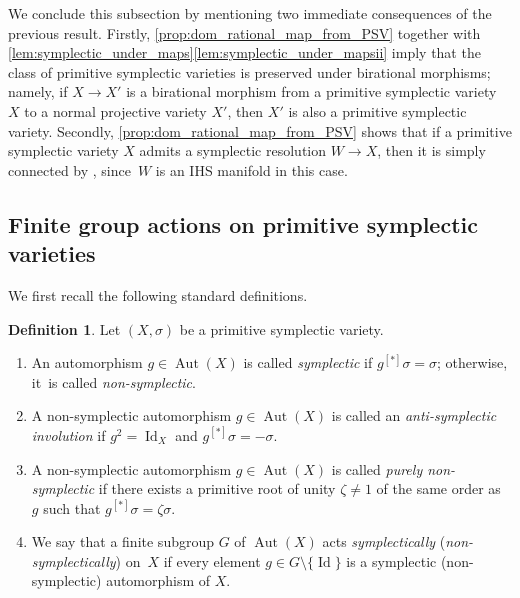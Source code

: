 \documentclass[JEP,XML,SOM,Unicode,published]{cedram}
\theoremstyle{plain}
\theoremstyle{definition}
\newtheorem{dfn}[thm]{Definition}
\DeclareMathOperator{\Id}{Id}
\DeclareMathOperator{\Aut}{Aut}
\begin{document}
We conclude this subsection by mentioning two immediate consequences of the previous result. Firstly, \autoref{prop:dom_rational_map_from_PSV} together with \autoref{lem:symplectic_under_maps}\eqref{lem:symplectic_under_mapsii} imply that the class of primitive symplectic varieties is preserved under birational morphisms; namely, if $X \to X'$ is a birational morphism from a primitive symplectic variety~$X$ to a normal projective variety $X'$, then $X'$ is also a primitive symplectic variety. Secondly, \autoref{prop:dom_rational_map_from_PSV} shows that if a primitive symplectic variety $X$ admits a symplectic resolution $W \to X$, then it is simply connected by \cite[Th.\,1.1]{Tak03}, since~$W$ is an IHS manifold in this case.

\subsection{Finite group actions on primitive symplectic varieties}
\label{subsection:finite_group_actions}

We first recall the following standard definitions.

\begin{dfn}
Let $(X,\sigma)$ be a primitive symplectic variety.
\begin{enumerate}
\item
An automorphism $g \in \Aut(X)$ is called \emph{symplectic} if $g^{[*]} \sigma = \sigma$; otherwise, it~is called \emph{non-symplectic}.

\item
A non-symplectic automorphism $g \in \Aut(X)$ is called an \emph{anti-symplectic involution} if $g^2 = \Id_X$ and $g^{[*]} \sigma = - \sigma$.

\item
A non-symplectic automorphism $g \in \Aut(X)$ is called \emph{purely non-symplectic} if there exists a primitive root of unity $\zeta \neq 1$ of the same order as $g$ such that $g^{[*]} \sigma = \zeta \sigma$.

\item
We say that a finite subgroup $G$ of $\Aut(X)$ acts \emph{symplectically} (\resp \emph{non-symplec\-tically}) on~$X$ if every element $g \in G \setminus \{\Id\}$ is a symplectic (\resp non-symplectic) automorphism of $X$.
\end{enumerate}
\end{dfn}
\end{document}
